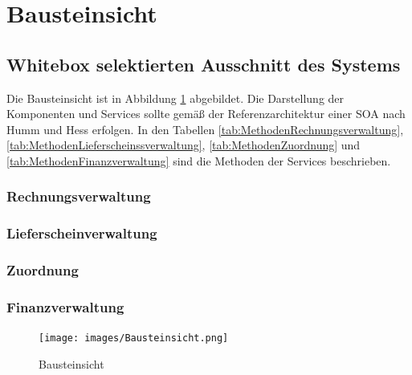 \section{Bausteinsicht}\label{section-building-block-view}

\subsection{Whitebox selektierten Ausschnitt des Systems} \label{_whitebox_gesamtsystem}

Die Bausteinsicht ist in Abbildung \ref{fig:Bausteinsicht} abgebildet. Die Darstellung der Komponenten und Services sollte gemäß der Referenzarchitektur einer SOA nach Humm und Hess erfolgen. In den Tabellen \ref{tab:MethodenRechnungsverwaltung}, \ref{tab:MethodenLieferscheinssverwaltung}, \ref{tab:MethodenZuordnung} und \ref{tab:MethodenFinanzverwaltung} sind die Methoden der Services beschrieben.

\subsubsection{Rechnungsverwaltung}\label{sec:Rechnungsverwaltung}



\subsubsection{Lieferscheinverwaltung}\label{sec:Lieferscheinverwaltung}



\subsubsection{Zuordnung}\label{sec:Zuordnung}



\subsubsection{Finanzverwaltung}\label{sec:Finanzverwaltung}



\begin{landscape}
\begin{figure}
  \centering
  \texttt{[image: images/Bausteinsicht.png]}
  \caption{Bausteinsicht}
  \label{fig:Bausteinsicht}
\end{figure}
\end{landscape}


